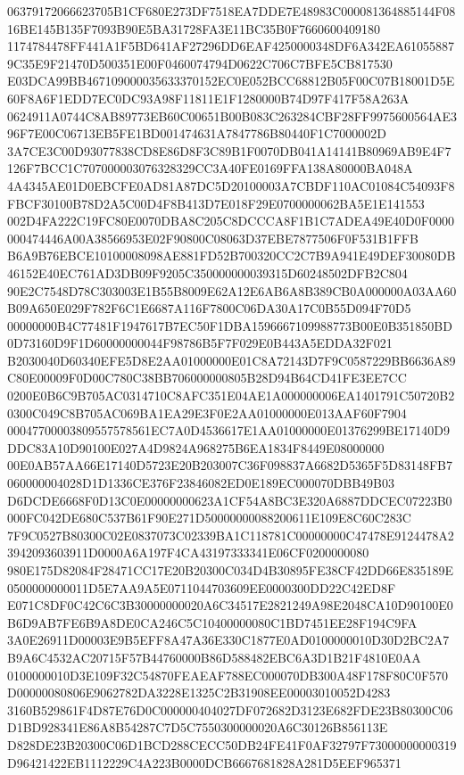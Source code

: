 \documentclass[UTF8,fontset=fandol,zihao=-4,a4paper]{ctexart}
\begin{document}
{{06379172066623705B1CF680E273DF7518EA7DDE7E48983C000081364885144F0816BE145B135F7093B90E5BA31728FA3E11BC35B0F7660600409180
1174784478FF441A1F5BD641AF27296DD6EAF4250000348DF6A342EA610558879C35E9F21470D500351E00F0460074794D0622C706C7BFE5CB817530
E03DCA99BB467109000035633370152EC0E052BCC68812B05F00C07B18001D5E60F8A6F1EDD7EC0DC93A98F11811E1F1280000B74D97F417F58A263A
0624911A0744C8AB89773EB60C00651B00B083C263284CBF28FF9975600564AE396F7E00C06713EB5FE1BD001474631A7847786B80440F1C7000002D
3A7CE3C00D93077838CD8E86D8F3C89B1F0070DB041A14141B80969AB9E4F7126F7BCC1C707000003076328329CC3A40FE0169FFA138A80000BA048A
4A4345AE01D0EBCFE0AD81A87DC5D20100003A7CBDF110AC01084C54093F8FBCF30100B78D2A5C00D4F8B413D7E018F29E0700000062BA5E1E141553
002D4FA222C19FC80E0070DBA8C205C8DCCCA8F1B1C7ADEA49E40D0F0000000474446A00A38566953E02F90800C08063D37EBE7877506F0F531B1FFB
B6A9B76EBCE10100008098AE881FD52B700320CC2C7B9A941E49DEF30080DB46152E40EC761AD3DB09F9205C350000000039315D60248502DFB2C804
90E2C7548D78C303003E1B55B8009E62A12E6AB6A8B389CB0A000000A03AA60B09A650E029F782F6C1E6687A116F7800C06DA30A17C0B55D094F70D5
00000000B4C77481F1947617B7EC50F1DBA1596667109988773B00E0B351850BD0D73160D9F1D60000000044F98786B5F7F029E0B443A5EDDA32F021
B2030040D60340EFE5D8E2AA01000000E01C8A72143D7F9C0587229BB6636A89C80E00009F0D00C780C38BB706000000805B28D94B64CD41FE3EE7CC
0200E0B6C9B705AC0314710C8AFC351E04AE1A000000006EA1401791C50720B20300C049C8B705AC069BA1EA29E3F0E2AA01000000E013AAF60F7904
00047700003809557578561EC7A0D4536617E1AA01000000E01376299BE17140D9DDC83A10D90100E027A4D9824A968275B6EA1834F8449E08000000
00E0AB57AA66E17140D5723E20B203007C36F098837A6682D5365F5D83148FB7060000004028D1D1336CE376F23846082ED0E189EC000070DBB49B03
D6DCDE6668F0D13C0E00000000623A1CF54A8BC3E320A6887DDCEC07223B0000FC042DE680C537B61F90E271D50000000088200611E109E8C60C283C
7F9C0527B80300C02E0837073C02339BA1C118781C00000000C47478E9124478A23942093603911D0000A6A197F4CA43197333341E06CF0200000080
980E175D82084F28471CC17E20B20300C034D4B30895FE38CF42DD66E835189E0500000000011D5E7AA9A5E0711044703609EE0000300DD22C42ED8F
E071C8DF0C42C6C3B30000000020A6C34517E2821249A98E2048CA10D90100E0B6D9AB7FE6B9A8DE0CA246C5C10400000080C1BD7451EE28F194C9FA
3A0E26911D00003E9B5EFF8A47A36E330C1877E0AD0100000010D30D2BC2A7B9A6C4532AC20715F57B44760000B86D588482EBC6A3D1B21F4810E0AA
0100000010D3E109F32C54870FEAEAF788EC000070DB300A48F178F80C0F570D00000080806E9062782DA3228E1325C2B31908EE00003010052D4283
3160B529861F4D87E76D0C000000404027DF072682D3123E682FDE23B80300C06D1BD928341E86A8B54287C7D5C7550300000020A6C30126B856113E
D828DE23B20300C06D1BCD288CECC50DB24FE41F0AF32797F73000000000319D96421422EB1112229C4A223B0000DCB6667681828A281D5EEF965371
}}
\end{document}
